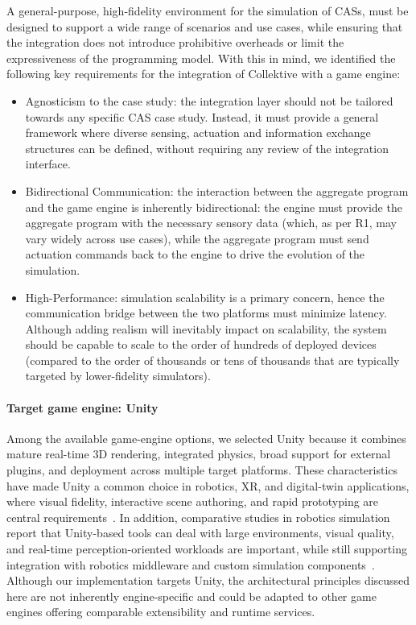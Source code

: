 A general-purpose, high-fidelity environment for the simulation of \acp{CAS},
must be designed to support a wide range of scenarios and use cases,
while ensuring that the integration does not introduce prohibitive overheads
or limit the expressiveness of the programming model.
%
With this in mind, we identified the following key requirements for the integration of Collektive with a game engine:
\begin{itemize}
    \item[R1] Agnosticism to the case study:
    the integration layer should not be tailored towards any specific \ac{CAS} case study.
    Instead, it must provide a general framework where diverse sensing, actuation and information exchange structures can be defined,
    without requiring any review of the integration interface.
    \item[R2] Bidirectional Communication:
    the interaction between the aggregate program and the game engine is inherently bidirectional:
    the engine must provide the aggregate program with the necessary sensory data
    (which, as per R1, may vary widely across use cases),
    while the aggregate program must send actuation commands back to the engine to drive the evolution of the simulation.
    \item[R3] High-Performance: simulation scalability is a primary concern,
    hence the communication bridge between the two platforms must minimize latency.
    Although adding realism will inevitably impact on scalability,
    the system should be capable to scale to the order of hundreds of deployed devices
    (compared to the order of thousands or tens of thousands that are typically targeted by lower-fidelity simulators).
\end{itemize}

\paragraph{Target game engine: Unity}

Among the available game-engine options,
we selected Unity because it combines mature real-time 3D rendering,
integrated physics, broad support for external plugins,
and deployment across multiple target platforms.
%
These characteristics have made Unity a common choice in robotics, XR, and digital-twin applications,
where visual fidelity, interactive scene authoring, and rapid prototyping are central requirements~\cite{Coronado2023XRGameEngines}.
%
In addition, comparative studies in robotics simulation report that Unity-based tools can deal with
large environments, visual quality, and real-time perception-oriented workloads are important,
while still supporting integration with robotics middleware and custom simulation components~\cite{DBLP:journals/jirs/PlattR22,DBLP:journals/simpra/WijayaCPKG24,Singh2025UnityGazeboDT}.
%
Although our implementation targets Unity, the architectural principles discussed here are not inherently engine-specific
and could be adapted to other game engines offering comparable extensibility and runtime services.

